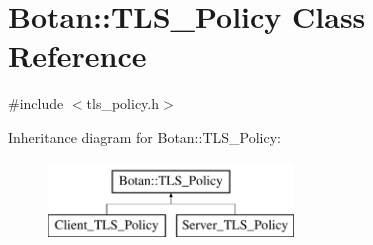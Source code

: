 \hypertarget{classBotan_1_1TLS__Policy}{\section{Botan\-:\-:T\-L\-S\-\_\-\-Policy Class Reference}
\label{classBotan_1_1TLS__Policy}
}


{\ttfamily \#include $<$tls\-\_\-policy.\-h$>$}

Inheritance diagram for Botan\-:\-:T\-L\-S\-\_\-\-Policy\-:\begin{figure}[H]
\begin{center}
\leavevmode
\includegraphics[height=2.000000cm]{classBotan_1_1TLS__Policy}
\end{center}
\end{figure}
